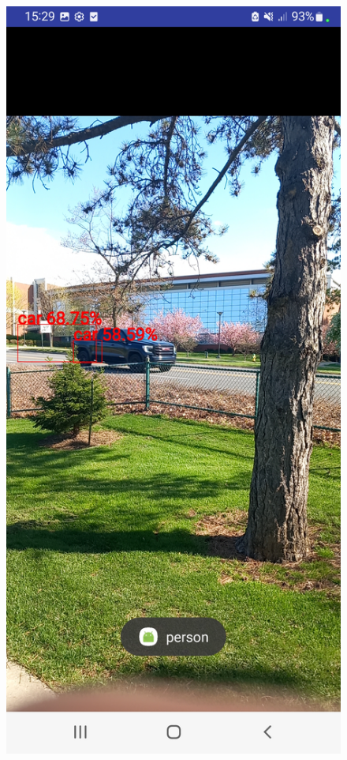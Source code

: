 \begin{figure}[H]
    \centering
    \includegraphics[scale=0.11]{figure/ObjectDetection_2in1.jpg}

\end{figure}
